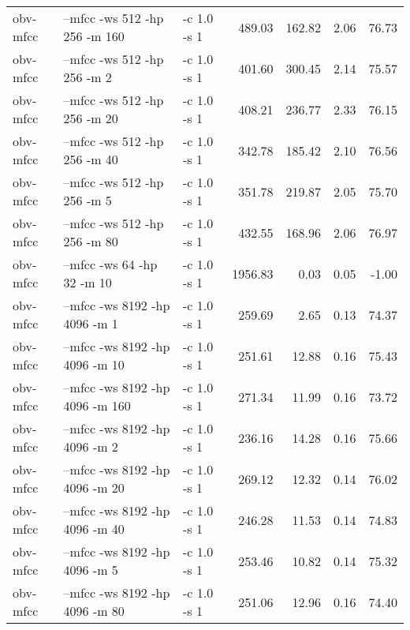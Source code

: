 \documentclass[11pt,a4paper]{article}
\begin{document}
\begin{tabular}{lllrrrr}
 obv-mfcc  &  --mfcc -ws 512  -hp 256  -m 160  &  -c 1.0 -s 1  &   489.03  &  162.82  &  2.06  &  76.73  \\
 obv-mfcc  &  --mfcc -ws 512  -hp 256  -m 2    &  -c 1.0 -s 1  &   401.60  &  300.45  &  2.14  &  75.57  \\
 obv-mfcc  &  --mfcc -ws 512  -hp 256  -m 20   &  -c 1.0 -s 1  &   408.21  &  236.77  &  2.33  &  76.15  \\
 obv-mfcc  &  --mfcc -ws 512  -hp 256  -m 40   &  -c 1.0 -s 1  &   342.78  &  185.42  &  2.10  &  76.56  \\
 obv-mfcc  &  --mfcc -ws 512  -hp 256  -m 5    &  -c 1.0 -s 1  &   351.78  &  219.87  &  2.05  &  75.70  \\
 obv-mfcc  &  --mfcc -ws 512  -hp 256  -m 80   &  -c 1.0 -s 1  &   432.55  &  168.96  &  2.06  &  76.97  \\
 obv-mfcc  &  --mfcc -ws 64   -hp 32   -m 10   &  -c 1.0 -s 1  &  1956.83  &    0.03  &  0.05  &  -1.00  \\
 obv-mfcc  &  --mfcc -ws 8192 -hp 4096 -m 1    &  -c 1.0 -s 1  &   259.69  &    2.65  &  0.13  &  74.37  \\
 obv-mfcc  &  --mfcc -ws 8192 -hp 4096 -m 10   &  -c 1.0 -s 1  &   251.61  &   12.88  &  0.16  &  75.43  \\
 obv-mfcc  &  --mfcc -ws 8192 -hp 4096 -m 160  &  -c 1.0 -s 1  &   271.34  &   11.99  &  0.16  &  73.72  \\
 obv-mfcc  &  --mfcc -ws 8192 -hp 4096 -m 2    &  -c 1.0 -s 1  &   236.16  &   14.28  &  0.16  &  75.66  \\
 obv-mfcc  &  --mfcc -ws 8192 -hp 4096 -m 20   &  -c 1.0 -s 1  &   269.12  &   12.32  &  0.14  &  76.02  \\
 obv-mfcc  &  --mfcc -ws 8192 -hp 4096 -m 40   &  -c 1.0 -s 1  &   246.28  &   11.53  &  0.14  &  74.83  \\
 obv-mfcc  &  --mfcc -ws 8192 -hp 4096 -m 5    &  -c 1.0 -s 1  &   253.46  &   10.82  &  0.14  &  75.32  \\
 obv-mfcc  &  --mfcc -ws 8192 -hp 4096 -m 80   &  -c 1.0 -s 1  &   251.06  &   12.96  &  0.16  &  74.40  \\
\end{tabular}
\end{document}
